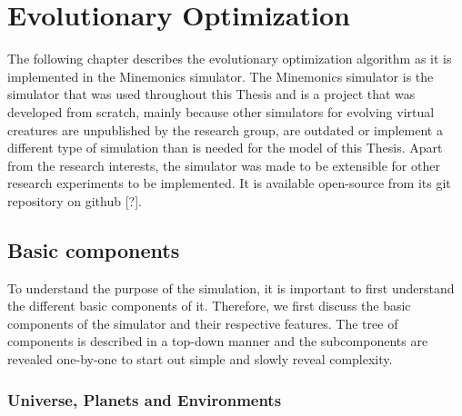 \documentclass[main]{subfiles}
\begin{document}
\setcounter{chapter}{1}

\chapter{Evolutionary Optimization} %

\label{Chapter\thechapter} %


The following chapter describes the evolutionary optimization algorithm as it is implemented in the Minemonics simulator. The Minemonics simulator is the simulator that was used throughout this Thesis and is a project that was developed from scratch, mainly because other simulators for evolving virtual creatures are unpublished by the research group, are outdated or implement a different type of simulation than is needed for the model of this Thesis. Apart from the research interests, the simulator was made to be extensible for other research experiments to be implemented. It is available open-source from its git repository on github [?].

\section{Basic components}

To understand the purpose of the simulation, it is important to first understand the different basic components of it. Therefore, we first discuss the basic components of the simulator and their respective features. The tree of components is described in a top-down manner and the subcomponents are revealed one-by-one to start out simple and slowly reveal complexity. 

\subsection{Universe, Planets and Environments}
\end{document}
